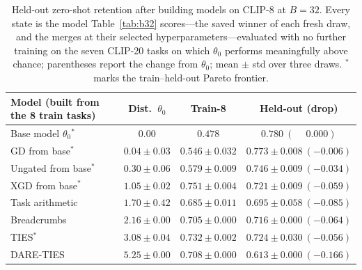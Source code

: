 \documentclass{article} %
\begin{document}
\begin{table}[t]
\centering
\scriptsize
\setlength{\tabcolsep}{3pt}
\caption{Held-out zero-shot retention after building models on CLIP-8 at $B{=}32$. Every state is the model Table~\ref{tab:b32} scores---the saved winner of each fresh draw, and the merges at their selected hyperparameters---evaluated with no further training on the seven CLIP-20 tasks on which $\theta_0$ performs meaningfully above chance; parentheses report the change from $\theta_0$; mean $\pm$ std over three draws. $^\ast$ marks the train--held-out Pareto frontier.}
\label{tab:heldout8}
\renewcommand{\arraystretch}{0.95}
\begin{tabular}{lccc}
\toprule
Model (built from the 8 train tasks) & Dist.\ $\theta_0$ & Train-8 & Held-out (drop) \\
\midrule
Base model $\theta_0$$^\ast$   & $0.00$        & $0.478$          & $0.780\ (\phantom{-}0.000)$ \\
GD from base$^\ast$            & $0.04\pm0.03$ & $0.546\pm0.032$  & $\mathbf{0.773}\pm0.008\ (-0.006)$ \\
Ungated from base$^\ast$       & $0.30\pm0.06$ & $0.579\pm0.009$  & $0.746\pm0.009\ (-0.034)$ \\
XGD from base$^\ast$           & $1.05\pm0.02$ & $\mathbf{0.751}\pm0.004$ & $0.721\pm0.009\ (-0.059)$ \\
Task arithmetic                & $1.70\pm0.42$ & $0.685\pm0.011$  & $0.695\pm0.058\ (-0.085)$ \\
Breadcrumbs                    & $2.16\pm0.00$ & $0.705\pm0.000$  & $0.716\pm0.000\ (-0.064)$ \\
TIES$^\ast$                    & $3.08\pm0.04$ & $0.732\pm0.002$  & $0.724\pm0.030\ (-0.056)$ \\
DARE-TIES                      & $5.25\pm0.00$ & $0.708\pm0.000$  & $0.613\pm0.000\ (-0.166)$ \\
\bottomrule
\end{tabular}
\end{table}
\end{document}
